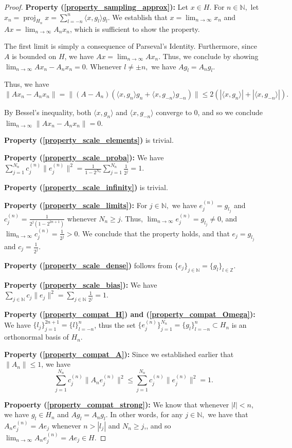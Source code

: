 \documentclass[10pt,a4paper]{amsart}
\def \Proj{\operatorname{proj}}
\def \LL{\langle}
\def \RR{\rangle}
\begin{document}
\begin{proof}
	\textbf{Property (\ref{property_sampling_approx}):} Let $x\in H.$ For $n\in\mathbb{N},$  let $x_n=\Proj_{H_n}x=\sum_{l=-n}^n \LL x, g_l\RR g_l.$ We establish that $x=\lim_{n\rightarrow\infty} x_n$ and $Ax=\lim_{n\rightarrow\infty} A_n x_n$, which is sufficient to show the property.
	
	The first limit is simply a consequence of Parseval's Identity. Furthermore, since $A$ is bounded on $H$, we have $Ax=\lim_{n\rightarrow\infty} Ax_n.$ Thus, we conclude by showing $\lim_{n\rightarrow\infty} Ax_n-A_nx_n=0$. Whenever $l\neq\pm n,$ we have $A g_l= A_n g_l.$ 
	
	Thus, we have $$\|Ax_n-A_nx_n\|=\|(A-A_n)(\LL x, g_n\RR g_n+\LL x, g_{-n}\RR g_{-n})\|\leq 2(|\LL x, g_n\RR|+|\LL x, g_{-n}\RR|).$$ 
	
	By Bessel's inequality, both $\LL x, g_n\RR$ and $\LL x, g_{-n}\RR$ converge to $0$, and so we conclude $\lim_{n\rightarrow\infty}\|Ax_n-A_nx_n\|=0.$
	
	\textbf{Property (\ref{property_scale_elements})} is trivial.
	
	\textbf{Property (\ref{property_scale_proba}):} We have $\sum_{j=1}^{N_n}c_j^{(n)}\|e_j^{(n)}\|^2=\frac{1}{1-2^{N_n}}\sum_{j=1}^{N_n}\frac{1}{2^j}=1.$
	
	\textbf{Property (\ref{property_scale_infinity})} is trivial.
	
	\textbf{Property (\ref{property_scale_limits}):} For $j\in \mathbb{N},$  we have $e_j^{(n)}=g_{l_j}$ and $c_j^{(n)}=\frac{1}{2^j(1-2^{2n+1})}$ whenever $N_n\geq j$. Thus, $\lim_{n\rightarrow\infty}e_j^{(n)}=g_{l_j}\neq 0$, and $\lim_{n\rightarrow\infty}c_j^{(n)}=\frac{1}{2^j}>0.$ We conclude that the property holds, and that $e_j=g_{l_j}$ and $c_j=\frac{1}{2^j}.$  
	
	\textbf{Property (\ref{property_scale_dense})} follows from $\{e_j\}_{j\in\mathbb{N}}=\{ g_l\}_{l\in \mathbb{Z}}.$
	
	\textbf{Property (\ref{property_scale_bias}):} We have $\sum_{j\in\mathbb{N}} c_j\|e_j\|^2=\sum_{j\in\mathbb{N}}\frac{1}{2^j}=1.$
	
	\textbf{Property (\ref{property_compat_H}) and (\ref{property_compat_Omega}):} We have  $\{l_j\}_{j=1}^{2n+1}=\{l\}_{l=-n}^n$, thus the set  $\{e_j^{(n)}\}_{j=1}^{N_n}=\{g_l\}_{l=-n}^n\subset H_n$ is an orthonormal basis of $H_n.$
	
	\textbf{Property (\ref{property_compat_A}):} Since we established earlier that $\|A_n\|\leq 1$, we have $$\sum_{j=1}^{N_n}c_j^{(n)}\|A_ne_j^{(n)}\|^2\leq\sum_{j=1}^{N_n}c_j^{(n)}\|e_j^{(n)}\|^2=1.$$
	
	\textbf{Propoerty (\ref{property_compat_strong}):} We know that whenever $|l|<n$, we have $g_l\in H_n$ and $A g_l=A_n g_l.$ In other words, for any $j\in\mathbb{N},$ we have that $A_n e_j^{(n)}=A e_j$ whenever  $n>|l_j|$ and $N_n\geq j$,, and so $\lim_{n\rightarrow\infty} A_ne_j^{(n)}=Ae_j\in H.$
\end{proof}
\end{document}
